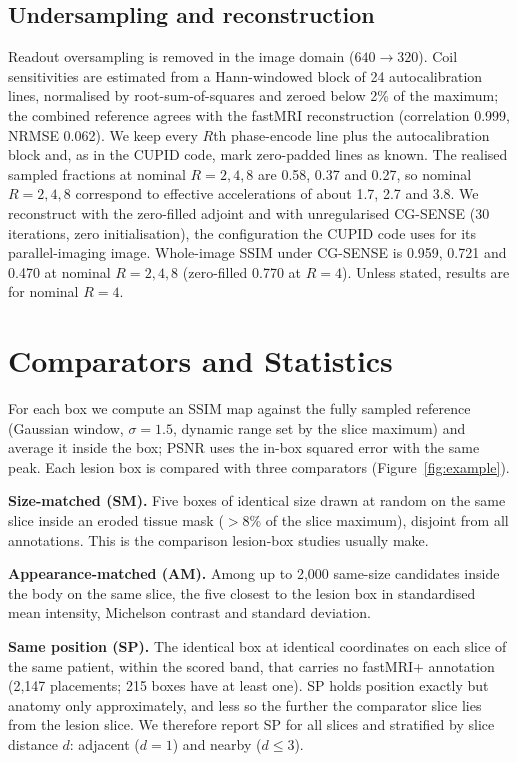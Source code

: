 \documentclass[letterpaper]{article} %
\begin{document}
\subsection{Undersampling and reconstruction}
Readout oversampling is removed in the image domain ($640\to320$). Coil
sensitivities are estimated from a Hann-windowed block of 24 autocalibration
lines, normalised by root-sum-of-squares and zeroed below 2\% of the maximum;
the combined reference agrees with the fastMRI reconstruction (correlation
0.999, NRMSE 0.062). We keep every $R$th phase-encode line plus the
autocalibration block and, as in the CUPID code, mark zero-padded lines as
known. The realised sampled fractions at nominal $R=2,4,8$ are 0.58, 0.37 and
0.27, so nominal $R=2,4,8$ correspond to effective accelerations of about
1.7, 2.7 and 3.8. We
reconstruct with the zero-filled adjoint and with unregularised CG-SENSE (30
iterations, zero initialisation), the configuration the CUPID code uses for
its parallel-imaging image. Whole-image SSIM under CG-SENSE is 0.959, 0.721
and 0.470 at nominal $R=2,4,8$ (zero-filled 0.770 at $R=4$). Unless stated, results
are for nominal $R=4$.

\section{Comparators and Statistics}

For each box we compute an SSIM map \citep{wang2004ssim} against the fully
sampled reference (Gaussian window, $\sigma=1.5$, dynamic range set by the
slice maximum) and average it inside the box; PSNR uses the in-box squared
error with the same peak. Each lesion box is compared with three comparators
(Figure~\ref{fig:example}).

\textbf{Size-matched (SM).} Five boxes of identical size drawn at random on
the same slice inside an eroded tissue mask ($>8\%$ of the slice maximum),
disjoint from all annotations. This is the comparison lesion-box studies
usually make.

\textbf{Appearance-matched (AM).} Among up to 2{,}000 same-size candidates
inside the body on the same slice, the five closest to the lesion box in
standardised mean intensity, Michelson contrast and standard deviation.

\textbf{Same position (SP).} The identical box at identical coordinates on
each slice of the same patient, within the scored band, that carries no
fastMRI+ annotation (2{,}147 placements; 215 boxes have at least one). SP
holds position exactly but anatomy only approximately, and less so the
further the comparator slice lies from the lesion slice. We therefore report
SP for all slices and stratified by slice distance $d$: adjacent ($d=1$) and
nearby ($d\le3$).
\end{document}
